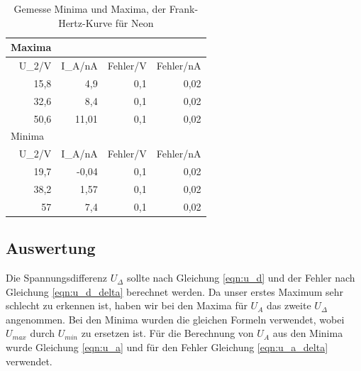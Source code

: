 \documentclass[12pt,a4paper]{article}
\begin{document}
\begin{table}[htbp]
\caption{Gemesse Minima und Maxima, der Frank-Hertz-Kurve für Neon}
\begin{center}
\begin{tabular}{|r|r|r|r|}
\hline
\multicolumn{1}{|l|}{Maxima} & \multicolumn{1}{l|}{} & \multicolumn{1}{l|}{} & \multicolumn{1}{l|}{} \\ \hline
U\_2/V & I\_A/nA & Fehler/V & Fehler/nA \\ \hline
15,8 & 4,9 & 0,1 & 0,02 \\ \hline
32,6 & 8,4 & 0,1 & 0,02 \\ \hline
50,6 & 11,01 & 0,1 & 0,02 \\ \hline
\multicolumn{1}{|l|}{Minima} & \multicolumn{1}{l|}{} & \multicolumn{1}{l|}{} & \multicolumn{1}{l|}{} \\ \hline
U\_2/V & I\_A/nA & Fehler/V & Fehler/nA \\ \hline
19,7 & -0,04 & 0,1 & 0,02 \\ \hline
38,2 & 1,57 & 0,1 & 0,02 \\ \hline
57 & 7,4 & 0,1 & 0,02 \\ \hline
\end{tabular}
\end{center}
\label{tab:n_m}
\end{table}


\subsection{Auswertung}
Die Spannungsdifferenz $U_\Delta$ sollte nach Gleichung \ref{eqn:u_d} und der Fehler nach Gleichung \ref{eqn:u_d_delta} berechnet werden.
Da unser erstes Maximum sehr schlecht zu erkennen ist, haben wir bei den Maxima für $U_A$ das zweite $U_\Delta$ angenommen.
Bei den Minima wurden die gleichen Formeln verwendet, wobei $U_{max}$ durch $U_{min}$ zu ersetzen ist. Für die Berechnung von $U_A$ aus den Minima wurde Gleichung \ref{eqn:u_a} und für den Fehler Gleichung \ref{eqn:u_a_delta} verwendet.
\end{document}
